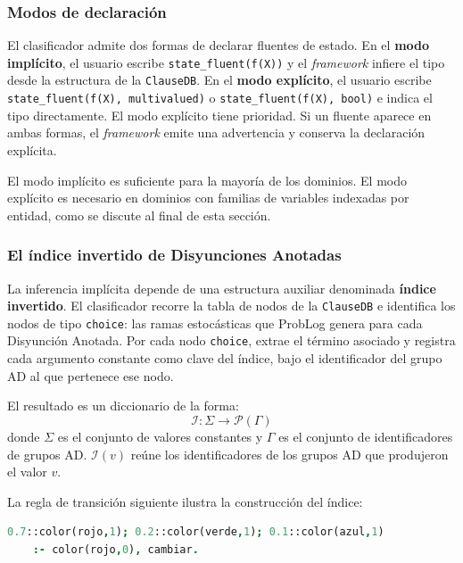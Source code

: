 \subsubsection{Modos de declaración}
\label{sec:di-modos-declaracion}

El clasificador admite dos formas de declarar fluentes de estado. En el
\textbf{modo implícito}, el usuario escribe \texttt{state\_fluent(f(X))} y el
\textit{framework} infiere el tipo desde la estructura de la \texttt{ClauseDB}.
En el \textbf{modo explícito}, el usuario escribe
\texttt{state\_fluent(f(X),~multivalued)} o \texttt{state\_fluent(f(X),~bool)}
e indica el tipo directamente. El modo explícito tiene prioridad. Si un fluente
aparece en ambas formas, el \textit{framework} emite una advertencia y conserva
la declaración explícita.

El modo implícito es suficiente para la mayoría de los dominios. El modo
explícito es necesario en dominios con familias de variables indexadas por
entidad, como se discute al final de esta sección.

\subsubsection{El índice invertido de Disyunciones Anotadas}
\label{sec:di-indice-invertido}

La inferencia implícita depende de una estructura auxiliar denominada
\textbf{índice invertido}. El clasificador recorre la tabla de nodos de la
\texttt{ClauseDB} e identifica los nodos de tipo \texttt{choice}: las ramas
estocásticas que ProbLog genera para cada Disyunción Anotada. Por cada nodo
\texttt{choice}, extrae el término asociado y registra cada argumento constante
como clave del índice, bajo el identificador del grupo AD al que pertenece ese
nodo.

El resultado es un diccionario de la forma:
\begin{equation*}
    \mathcal{I} : \Sigma \to \mathcal{P}(\Gamma)
\end{equation*}
donde $\Sigma$ es el conjunto de valores constantes y $\Gamma$ es el conjunto de
identificadores de grupos AD. $\mathcal{I}(v)$ reúne los identificadores de los grupos AD que produjeron el
valor $v$.

La regla de transición siguiente ilustra la construcción del índice:

\begin{lstlisting}[language=Prolog]
0.7::color(rojo,1); 0.2::color(verde,1); 0.1::color(azul,1)
    :- color(rojo,0), cambiar.
\end{lstlisting}

